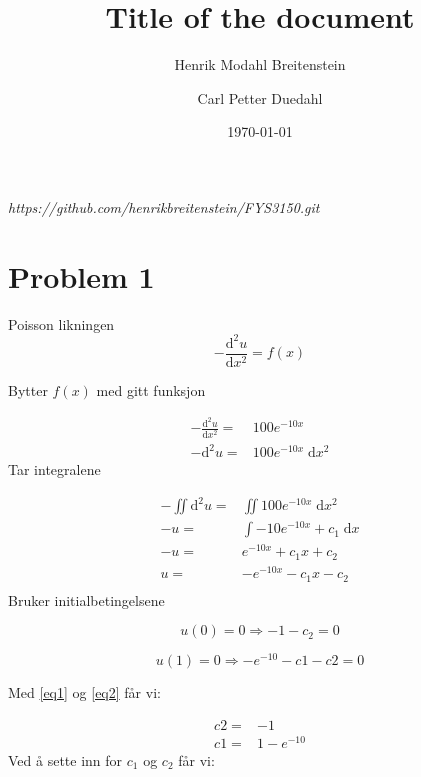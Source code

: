 \documentclass[english,notitlepage]{revtex4-1}  %
\begin{document}
\title{Title of the document}      %
\author{Henrik Modahl Breitenstein}          %
\author{Carl Petter Duedahl}
\date{\today}                             %
\noaffiliation                            %


\maketitle

\begin{center}
	\textit{https://github.com/henrikbreitenstein/FYS3150.git}
\end{center}

\section*{Problem 1}

Poisson likningen
$$- \frac{\mathrm{d}^2 u}{\mathrm{d}x^2} = f(x)$$

Bytter $f(x)$ med gitt funksjon

\begin{align*}
- \frac{\mathrm{d}^2 u}{\mathrm{d}x^2} =& 100e^{-10x} \\
-\mathrm{d}^2 u =& 100e^{-10x} \; \mathrm{d}x^2
\end{align*}
Tar integralene

\begin{align*}
-\iint \mathrm{d}^2 u =& \iint 100e^{-10x} \; \mathrm{d}x^2 \\
-u =& \int -10e^{-10x} + c_1 \; \mathrm{d} x \\
-u =& e^{-10x} + c_1x + c_2 \\
u =& -e^{-10x} - c_1x - c_2 \\
\end{align*}
Bruker initialbetingelsene


\begin{equation}\label{eq1}
u(0) = 0 \Rightarrow - 1 - c_2 = 0
\end{equation}


\begin{equation}\label{eq2}
u(1) = 0 \Rightarrow -e^{-10} -c1 -c2 = 0
\end{equation}

Med \ref{eq1} og \ref{eq2} får vi:

\begin{align*}
c2 =& -1 \\
c1 =& 1 - e^{-10}
\end{align*}
Ved å sette inn for $c_1$ og $c_2$ får vi:
\end{document}
